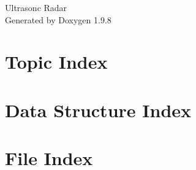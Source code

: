 \documentclass[twoside]{book}
\newcommand{\+}{\discretionary{\mbox{\scriptsize$\hookleftarrow$}}{}{}}
\newcommand{\clearemptydoublepage}{%
    \newpage{\pagestyle{empty}\cleardoublepage}%
  }
\begin{document}
  \raggedbottom
  \begin{titlepage}
  \vspace*{7cm}
  \begin{center}%
  {\Large Ultrasonc Radar}\\
  \vspace*{1cm}
  {\large Generated by Doxygen 1.9.8}\\
  \end{center}
  \end{titlepage}
  \clearemptydoublepage
  \tableofcontents
  \clearemptydoublepage




\chapter{Topic Index}

\chapter{Data Structure Index}

\chapter{File Index}

\end{document}
